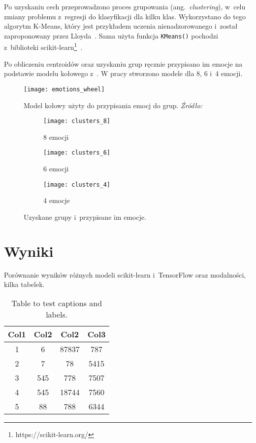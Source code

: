 Po uzyskaniu cech przeprowadzono proces grupowania (ang.~\textit{clustering}), w~celu zmiany problemu z~regresji do klasyfikacji dla kilku klas.
Wykorzystano do tego algorytm K-Means, który jest przykładem uczenia nienadzorowanego i~został zaproponowany przez Lloyda~\cite{Lloyd1982}.
Sama użyta funkcja \texttt{KMeans()} pochodzi z~biblioteki scikit-learn\footnote{https://scikit-learn.org/}~\cite{scikit-learn}.

Po obliczeniu centroidów oraz uzyskaniu grup ręcznie przypisano im emocje na podstawie modelu kołowego z~\cite{Kollias2019}.
W pracy stworzono modele dla 8, 6 i~4 emocji.

\begin{figure}[h]
    \centering
    \texttt{[image: emotions\_wheel]}
    \caption{Model kołowy użyty do przypisania emocj do grup. \textit{Źródło:~\cite{Kollias2019}}}
    \label{fig:emotions-wheel}
\end{figure}

\begin{figure}[h!]
    \begin{subfigure}{0.5\textwidth}
        \centering
        \texttt{[image: clusters\_8]}
        \caption{8 emocji}
        \label{fig:clusters-8}
    \end{subfigure}
    \begin{subfigure}{0.5\textwidth}
        \centering
        \texttt{[image: clusters\_6]}
        \caption{6 emocji}
        \label{fig:clusters-6}
    \end{subfigure}
    \begin{subfigure}{0.5\textwidth}
        \centering
        \texttt{[image: clusters\_4]}
        \caption{4 emocje}
        \label{fig:clusters-4}
    \end{subfigure}
    \caption{Uzyskane grupy i~przypisane im emocje.}
    \label{fig:clusters-all}
\end{figure}

\section{Wyniki}\label{sec:wyniki}
Porównanie wyników różnych modeli scikit-learn i~TensorFlow oraz modalności, kilka tabelek.

\begin{table}[h!]
    \centering
    \begin{tabular}{||c c c c||}
        \hline
        Col1 & Col2 & Col2 & Col3 \\ [0.5ex]
        \hline\hline
        1 & 6 & 87837 & 787 \\
        2 & 7 & 78 & 5415 \\
        3 & 545 & 778 & 7507 \\
        4 & 545 & 18744 & 7560 \\
        5 & 88 & 788 & 6344 \\ [1ex]
        \hline
    \end{tabular}
    \caption{Table to test captions and labels.}
    \label{tab:table1}
\end{table}

